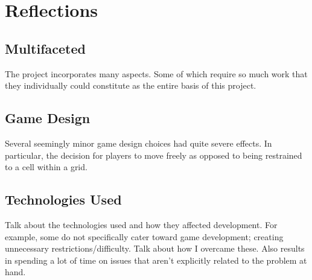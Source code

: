 \documentclass{standalone}
\begin{document}
	\section{Reflections}
		\subsection{Multifaceted}
			The project incorporates many aspects. Some of which require so much work that they individually could constitute as the entire basis of this project.

		\subsection{Game Design}
			Several seemingly minor game design choices had quite severe effects. In particular, the decision for players to move freely as opposed to being restrained to a cell within a grid.

		\subsection{Technologies Used}
			Talk about the technologies used and how they affected development. For example, some do not specifically cater toward game development; creating unnecessary restrictions/difficulty. Talk about how I overcame these. Also results in spending a lot of time on issues that aren't explicitly related to the problem at hand. 
\end{document}
